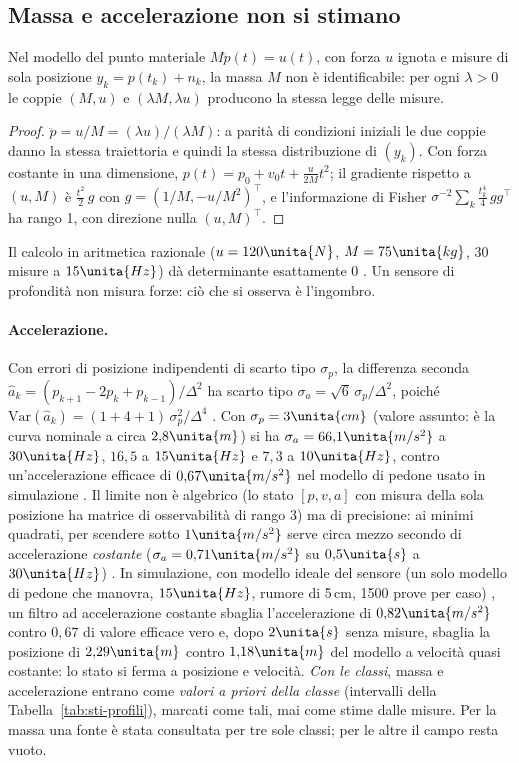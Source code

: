 \subsection{Massa e accelerazione non si stimano}\label{sec:sti-massa}

\begin{proposizione}\label{prop:sti-massa}
Nel modello del punto materiale $M\ddot p(t)=u(t)$, con forza $u$ ignota e misure di sola posizione $y_k=p(t_k)+n_k$, la massa $M$ non è identificabile: per ogni $\lambda>0$ le coppie $(M,u)$ e $(\lambda M,\lambda u)$ producono la stessa legge delle misure. 
\end{proposizione}
\begin{proof}
$\ddot p=u/M=(\lambda u)/(\lambda M)$: a parità di condizioni iniziali le due coppie danno la stessa traiettoria e quindi la stessa distribuzione di $(y_k)$. Con forza costante in una dimensione, $p(t)=p_0+v_0t+\tfrac{u}{2M}t^2$; il gradiente rispetto a $(u,M)$ è $\tfrac{t^2}{2}\,g$ con $g=(1/M,-u/M^2)^{\top}$, e l'informazione di Fisher $\sigma^{-2}\sum_k\tfrac{t_k^4}{4}\,gg^{\top}$ ha rango 1, con direzione nulla $(u,M)^{\top}$.
\end{proof}
Il calcolo in aritmetica razionale ($u=120\unita{N}$, $M=75\unita{kg}$, 30 misure a $15\unita{Hz}$) dà determinante esattamente 0 . Un sensore di profondità non misura forze: ciò che si osserva è l'ingombro.

\paragraph{Accelerazione.} Con errori di posizione indipendenti di scarto tipo $\sigma_p$, la differenza seconda $\hat a_k=(p_{k+1}-2p_k+p_{k-1})/\Delta^2$ ha scarto tipo $\sigma_a=\sqrt6\,\sigma_p/\Delta^2$, poiché $\mathrm{Var}(\hat a_k)=(1+4+1)\,\sigma_p^2/\Delta^4$ . Con $\sigma_p=3\unita{cm}$ (valore assunto: è la curva nominale a circa $2{,}8\unita{m}$) si ha $\sigma_a=66{,}1\unita{m/s^2}$ a $30\unita{Hz}$, $16{,}5$ a $15\unita{Hz}$ e $7{,}3$ a $10\unita{Hz}$, contro un'accelerazione efficace di $0{,}67\unita{m/s^2}$ nel modello di pedone usato in simulazione . Il limite non è algebrico (lo stato $[p,v,a]$ con misura della sola posizione ha matrice di osservabilità di rango 3) ma di precisione: ai minimi quadrati, per scendere sotto $1\unita{m/s^2}$ serve circa mezzo secondo di accelerazione \emph{costante} ($\sigma_a=0{,}71\unita{m/s^2}$ su $0{,}5\unita{s}$ a $30\unita{Hz}$) . In simulazione, con modello ideale del sensore (un solo modello di pedone che manovra, $15\unita{Hz}$, rumore di 5\,cm, 1500 prove per caso) , un filtro ad accelerazione costante sbaglia l'accelerazione di $0{,}82\unita{m/s^2}$ contro $0{,}67$ di valore efficace vero e, dopo $2\unita{s}$ senza misure, sbaglia la posizione di $2{,}29\unita{m}$ contro $1{,}18\unita{m}$ del modello a velocità quasi costante: lo stato si ferma a posizione e velocità. \emph{Con le classi}, massa e accelerazione entrano come \emph{valori a priori della classe} (intervalli della Tabella~\ref{tab:sti-profili}), marcati come tali, mai come stime dalle misure. Per la massa una fonte è stata consultata per tre sole classi; per le altre il campo resta vuoto.

